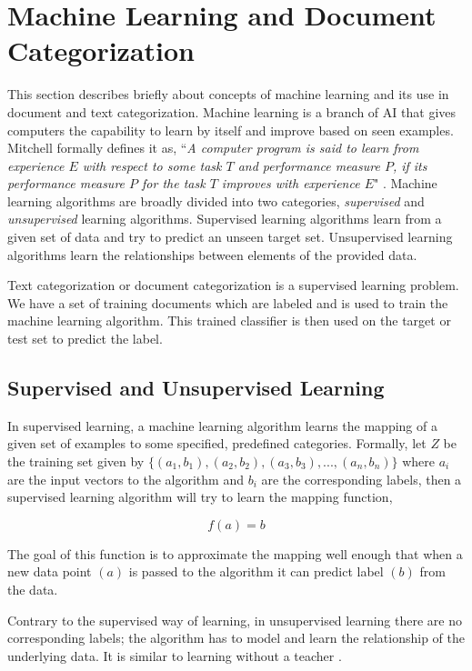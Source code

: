 \section{Machine Learning and Document Categorization}
This section describes briefly about concepts of machine learning and its use in document and text categorization. Machine learning is a branch of \gls{AI} that gives computers the capability to learn by itself and improve based on seen examples. Mitchell formally defines it as, ``\textit{A computer program is said to learn from experience $E$ with respect to some task $T$ and performance measure $P$, if its performance measure $P$ for the task $T$ improves with experience $E$}" \cite{Mitchell:1997:ML:541177}. Machine learning algorithms are broadly divided into two categories, \textit{supervised} and \textit{unsupervised} learning algorithms. Supervised learning algorithms learn from a given set of data and try to predict an unseen target set. Unsupervised learning algorithms learn the relationships between elements of the provided data. 

Text categorization or document categorization is a supervised learning problem. We have a set of training documents which are labeled and is used to train the machine learning algorithm. This trained classifier is then used on the target or test set to predict the label.

\subsection{Supervised and Unsupervised Learning}
In supervised learning, a machine learning algorithm learns the mapping of a given set of examples to some specified, predefined categories. Formally, let $Z$ be the training set given by $\{(a_{1},b_{1}), (a_{2},b_{2}), (a_{3},b_{3}),...,(a_{n},b_{n})\}$ where $a_{i}$ are the input vectors to the algorithm and $b_{i}$ are the corresponding labels, then a supervised learning algorithm will try to learn the mapping function,

\begin{equation}
    f(a)  = b
\end{equation}

The goal of this function is to approximate the mapping well enough that when a new data point $(a)$ is passed to the algorithm it can predict label $(b)$ from the data.  

Contrary to the supervised way of learning, in unsupervised learning there are no corresponding labels; the algorithm has to model and learn the relationship of the underlying data. It is similar to learning without a teacher \cite{hinton1999unsupervised}.

